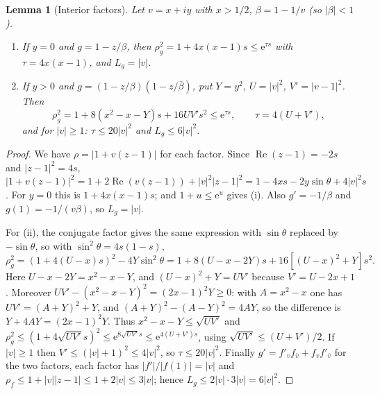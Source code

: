 \documentclass[11pt]{article}
\newtheorem{alemma}{Lemma}[section]
\theoremstyle{remark}\newtheorem{remark}[theorem]{Remark}
\newcommand{\Rea}{\operatorname{Re}}
\newcommand{\ee}{\mathrm e}
\begin{document}
\begin{alemma}[Interior factors]\label{lem:interior}
Let \(v=x+iy\) with \(x>1/2\), \(\beta=1-1/v\) (so \(|\beta|<1\)).
\begin{enumerate}
\item[(i)] If \(y=0\) and \(g=1-z/\beta\), then
 \(\rho_g^2=1+4x(x-1)s\le\ee^{\tau s}\) with \(\tau=4x(x-1)\), and
 \(L_g=|v|\).
\item[(ii)] If \(y>0\) and \(g=(1-z/\beta)(1-z/\bar\beta)\), put
 \(Y=y^2\), \(U=|v|^2\), \(V'=|v-1|^2\). Then
 \[
  \rho_g^2=1+8(x^2-x-Y)s+16UV's^2\le\ee^{\tau s},\qquad\tau=4(U+V'),
 \]
 and for \(|v|\ge1\): \(\tau\le20|v|^2\) and \(L_g\le6|v|^2\).
\end{enumerate}
\end{alemma}
\begin{proof}
We have \(\rho=|1+v(z-1)|\) for each factor. Since
\(\Rea(z-1)=-2s\) and \(|z-1|^2=4s\),
\(|1+v(z-1)|^2=1+2\Rea(v(z-1))+|v|^2|z-1|^2
=1-4xs-2y\sin\theta+4|v|^2s\).
For \(y=0\) this is \(1+4x(x-1)s\); and \(1+u\le\ee^u\) gives (i). Also
\(g'=-1/\beta\) and \(g(1)=-1/(v\beta)\), so \(L_g=|v|\).

For (ii), the conjugate factor gives the same expression with
\(\sin\theta\) replaced by \(-\sin\theta\), so with
\(\sin^2\theta=4s(1-s)\),
\[
 \rho_g^2=(1+4(U-x)s)^2-4Y\sin^2\theta
 =1+8(U-x-2Y)s+16[(U-x)^2+Y]s^2 .
\]
Here \(U-x-2Y=x^2-x-Y\), and \((U-x)^2+Y=UV'\) because
\(V'=U-2x+1\). Moreover
\(UV'-(x^2-x-Y)^2=(2x-1)^2Y\ge0\): with \(A=x^2-x\) one has
\(UV'=(A+Y)^2+Y\), and \((A+Y)^2-(A-Y)^2=4AY\), so the difference is
\(Y+4AY=(2x-1)^2Y\).
Thus \(x^2-x-Y\le\sqrt{UV'}\) and
\(\rho_g^2\le(1+4\sqrt{UV'}s)^2\le\ee^{8\sqrt{UV'}s}\le\ee^{4(U+V')s}\),
using \(\sqrt{UV'}\le(U+V')/2\). If \(|v|\ge1\) then
\(V'\le(|v|+1)^2\le4|v|^2\), so \(\tau\le20|v|^2\). Finally
\(g'=f'_vf_{\bar v}+f_vf'_{\bar v}\) for the two factors, each factor has
\(|f'|/|f(1)|=|v|\) and \(\rho_f\le1+|v||z-1|\le1+2|v|\le3|v|\); hence
\(L_g\le2|v|\cdot3|v|=6|v|^2\).
\end{proof}
\end{document}
